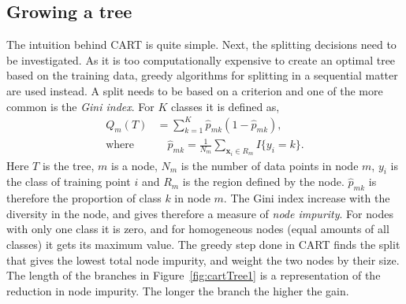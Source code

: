 \subsection{Growing a tree}
\label{sub:Growing a tree}
The intuition behind CART is quite simple. Next, the splitting decisions need to be investigated. As it is too computationally expensive to create an optimal tree based on the training data, greedy algorithms for splitting in a sequential matter are used instead. A split needs to be based on a criterion and one of the more common is the \textit{Gini index}. For $K$ classes it is defined as,
\begin{align}
  Q_m(T) &= \sum^{K}_{k=1} \hat{p}_{mk} (1 - \hat{p}_{mk}),  \\ 
  \label{eq:pmk} 
  \text{where}& \quad \hat{p}_{mk} = \frac{1}{N_m} \sum_{\mathbf{x}_i \in R_m} I\{y_i = k\}.
\end{align}
Here $T$ is the tree, $m$ is a node, $N_m$ is the number of data points in node $m$, $y_i$ is the class of training point $i$ and $R_m$ is the region defined by the node.
$\hat{p}_{mk}$ is therefore the proportion of class $k$ in node $m$.
The Gini index increase with the diversity in the node, and gives therefore a measure of \textit{node impurity}. For nodes with only one class it is zero, and for homogeneous nodes (equal amounts of all classes) it gets its maximum value. The greedy step done in CART finds the split that gives the lowest total node impurity, and weight the two nodes by their size.  
The length of the branches in Figure~\ref{fig:cartTree1} is a representation of the reduction in node impurity. The longer the branch the higher the gain.

